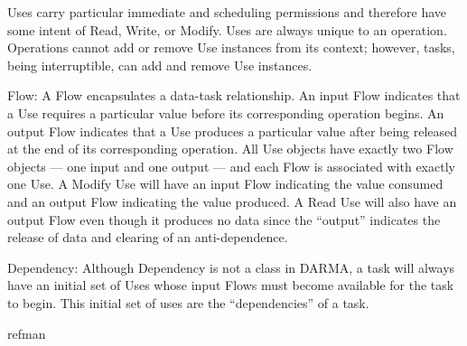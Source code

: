 \begin{compactdesc}
Uses carry particular immediate and scheduling permissions and therefore have some intent of Read, Write, or Modify.
  Uses are always unique to an \gls{operation}.
Operations cannot add or remove Use instances from its context;
however, tasks, being interruptible, can add and remove Use instances.
\item [Flow:] A Flow encapsulates a data-task relationship. 
An input Flow indicates that a Use requires a particular value before its
corresponding \gls{operation} begins.
An output Flow indicates that a Use produces a particular value after being
released at the end of its corresponding \gls{operation}.
All Use objects have exactly two Flow objects --- one input and one output ---
and each Flow is associated with exactly one Use.
A Modify Use will have an input Flow indicating the value consumed and an output Flow indicating the value produced.
A Read Use will also have an output Flow even though it produces no data since the ``output'' indicates the release of data and clearing of an anti-dependence.
\item [Dependency:] Although Dependency is not a class in \gls{DARMA}, a
  \gls{task} will always have an initial set of Uses whose input Flows must become
  available for the \gls{task} to begin.
  This initial set of uses are the ``dependencies'' of a \gls{task}.
\end{compactdesc} 

{refman}
